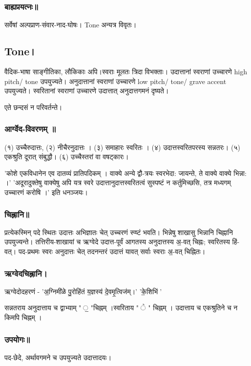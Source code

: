 \documentclass[oneside, article]{memoir}
\begin{document}
\subsubsection{बाह्यप्रयत्नः॥}
सर्वेषां अल्पप्राण-संवार-नाद-घोषः। Tone अन्यत्र विवृतः।

\subsection{Tone।}
वैदिक-भाषा साङ्गीतिका, लौकिकाः अपि।स्वराः मूलतः त्रिदा विभक्ताः। उदात्तानां स्वराणां उच्चारणे high pitch/ tone उपयुज्यते। अनुदात्तानां स्वराणां उच्चारणे low pitch/ tone/ grave accent उपयुज्यते। स्वरितानां स्वराणां उच्चारणे उदात्तात् अनुदात्तगमनं दृष्यते।

एते छन्दसं न परिवर्तन्ते। 

\subsubsection{आर्ग्वेद-विवरणम् ॥}
(१) उच्चैरुदात्तः, (२) नीचैरनुदात्तः । (३) समाहारः स्वरितः । (४) उदात्तस्वरितपरस्य सन्नतरः। (५) एकश्रुति दूरात् संबुद्धौ। (६) उच्चैस्तरां वा वषट्कारः। 

'कोशे एकविधानेन एव दातव्यं प्रातिपदिकम् । वाक्ये अन्ये द्वौ-त्रयः स्वरभेदा: जायन्ते, ते वाक्ये वाक्ये भिन्ना: ।' 'अदूरादुक्तेषु वाक्येषु अपि यत्र स्वरे उदात्तानुदात्तस्वरितत्वं सुस्पष्टं न कर्तुमिच्छसि, तत्र मध्यगम् उच्चारणं करोषि ।' इति धनञ्जयः।

\subsubsection{चिह्नानि॥}
प्रत्येकस्मिन् पदे स्थितः उदात्तः अभिज्ञातः चेत् उच्चरणं‌ स्प्ष्टं‌ भवति। भिन्नेषु शाखासु भिन्नानि चिह्नानि उपयुज्यन्ते। तत्तिरीय-शाखायां च ऋग्वेदे उदात्त-पूर्वं आगतस्य अनुदात्तस्य अ॒-वत् चिह्नः; स्वरितस्य हि॑-वत्। पद-प्रथमः स्वरः अनुदात्तः चेत् तदनन्तरं उदात्तं यावत् सर्वाः स्वराः अ॒-वत् चिह्नितः।

\subsubsection{ऋग्वेदचिह्नानि।}
ऋग्वेदोदहरणं - 'अ॒ग्निमी॑ळे पु॒रोहि॑तं य॒ज्ञस्य॑ दे॒वमृ॒त्विज॑म्।' 'के॒शिभि॑'

सन्नतराय अनुदात्ताय च द्वाभ्याम् " ॒ "चिह्नम् ।स्वरिताय "  ॓ " चिह्नम् । उदात्ताय च एकश्रुतिने च न किमपि चिह्नम् ।



\subsubsection{उपयोगः॥}
पद-छेदे, अर्थावगमने च उपयुज्यते उदात्तादयः।
\end{document}
